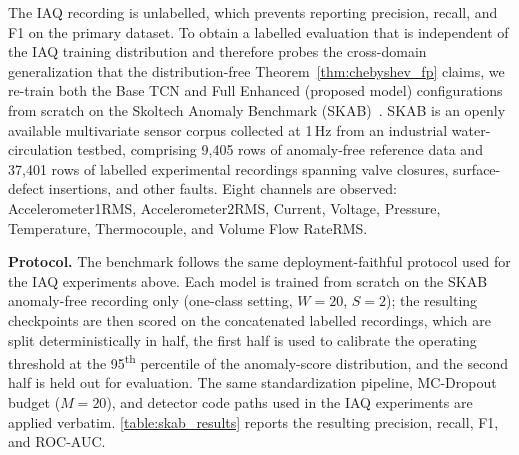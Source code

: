 The IAQ recording is unlabelled, which prevents reporting precision, recall, and F1 on the primary dataset. To obtain a labelled evaluation that is independent of the IAQ training distribution and therefore probes the cross-domain generalization that the distribution-free Theorem~\ref{thm:chebyshev_fp} claims, we re-train both the Base TCN and Full Enhanced (proposed model) configurations from scratch on the Skoltech Anomaly Benchmark (SKAB)~\cite{skab_dataset,filonov2016multivariate}. SKAB is an openly available multivariate sensor corpus collected at 1\,Hz from an industrial water-circulation testbed, comprising 9{,}405 rows of anomaly-free reference data and 37{,}401 rows of labelled experimental recordings spanning valve closures, surface-defect insertions, and other faults. Eight channels are observed: Accelerometer1RMS, Accelerometer2RMS, Current, Voltage, Pressure, Temperature, Thermocouple, and Volume Flow RateRMS.

\textbf{Protocol.} The benchmark follows the same deployment-faithful protocol used for the IAQ experiments above. Each model is trained from scratch on the SKAB anomaly-free recording only (one-class setting, $W=20$, $S=2$); the resulting checkpoints are then scored on the concatenated labelled recordings, which are split deterministically in half, the first half is used to calibrate the operating threshold at the 95\textsuperscript{th} percentile of the anomaly-score distribution, and the second half is held out for evaluation. The same standardization pipeline, MC-Dropout budget ($M=20$), and detector code paths used in the IAQ experiments are applied verbatim. \cref{table:skab_results} reports the resulting precision, recall, F1, and ROC-AUC.



